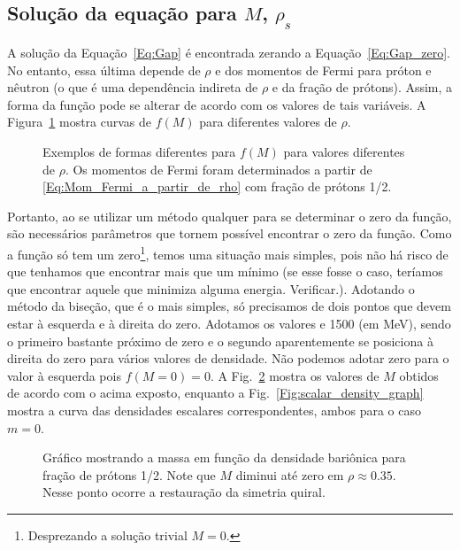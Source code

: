 \begin{enumerate}
\subsection{Solução da equação para $M$, $\rho_s$}

A solução da Equação~\eqref{Eq:Gap} é encontrada zerando a Equação~\eqref{Eq:Gap_zero}. No entanto, essa última depende de $\rho$ e dos momentos de Fermi para próton e nêutron (o que é uma dependência indireta de $\rho$ e da fração de prótons). Assim, a forma da função pode se alterar de acordo com os valores de tais variáveis. A Figura~\ref{Fig:Gap_zero_graph} mostra curvas de $f(M)$ para diferentes valores de $\rho$.

\begin{figure}
	
	\caption{Exemplos de formas diferentes para $f(M)$ para valores diferentes de $\rho$. Os momentos de Fermi foram determinados a partir de \eqref{Eq:Mom_Fermi_a_partir_de_rho} com fração de prótons 1/2. \protect}
	\label{Fig:Gap_zero_graph}
\end{figure}

Portanto, ao se utilizar um método qualquer para se determinar o zero da função, são necessários parâmetros que tornem possível encontrar o zero da função. Como a função só tem um zero\footnote[][1cm]{Desprezando a solução trivial $M = 0$.}, temos uma situação mais simples, pois não há risco de que tenhamos que encontrar mais que um mínimo (se esse fosse o caso, teríamos que encontrar aquele que minimiza alguma energia\cite{Buballa}. Verificar.). Adotando o método da biseção, que é o mais simples, só precisamos de dois pontos que devem estar à esquerda e à direita do zero. Adotamos os valores  e 1500 (em MeV), sendo o primeiro bastante próximo de zero e o segundo aparentemente se posiciona à direita do zero para vários valores de densidade. Não podemos adotar zero para o valor à esquerda pois $f(M=0) = 0$. A Fig.~\ref{Fig:mass_graph} mostra os valores de $M$ obtidos de acordo com o acima exposto, enquanto a Fig.~\ref{Fig:scalar_density_graph} mostra a curva das densidades escalares correspondentes, ambos para o caso $m = 0$.

\begin{figure}
	
	\caption{Gráfico mostrando a massa em função da densidade bariônica para fração de prótons 1/2. Note que $M$ diminui até zero em $\rho \approx 0.35$. Nesse ponto ocorre a restauração da simetria quiral. \protect}
	\label{Fig:mass_graph}
\end{figure}


\end{enumerate}

